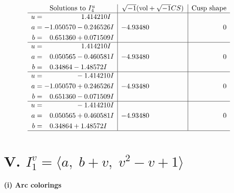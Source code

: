 \documentclass[1p]{elsarticle_modified}
\theoremstyle{definition}
\newcommand{\I}{\sqrt{-1}}
\begin{document}
$$\begin{array}{c|c|c}  
\text{Solutions to }I^u_{4}& \I (\text{vol} + \sqrt{-1}CS) & \text{Cusp shape}\\
 \hline 
\begin{aligned}
u &= \phantom{-0.000000 -}1.414210 I \\
a &= -1.050570 - 0.246526 I \\
b &= \phantom{-}0.651360 + 0.071509 I\end{aligned}
 & -4.93480\phantom{ +0.000000I} & \phantom{-0.000000 } 0 \\ \hline\begin{aligned}
u &= \phantom{-0.000000 -}1.414210 I \\
a &= \phantom{-}0.050565 - 0.460581 I \\
b &= \phantom{-}0.34864 - 1.48572 I\end{aligned}
 & -4.93480\phantom{ +0.000000I} & \phantom{-0.000000 } 0 \\ \hline\begin{aligned}
u &= \phantom{-0.000000 } -1.414210 I \\
a &= -1.050570 + 0.246526 I \\
b &= \phantom{-}0.651360 - 0.071509 I\end{aligned}
 & -4.93480\phantom{ +0.000000I} & \phantom{-0.000000 } 0 \\ \hline\begin{aligned}
u &= \phantom{-0.000000 } -1.414210 I \\
a &= \phantom{-}0.050565 + 0.460581 I \\
b &= \phantom{-}0.34864 + 1.48572 I\end{aligned}
 & -4.93480\phantom{ +0.000000I} & \phantom{-0.000000 } 0\\
 \hline 
 \end{array}$$\newpage\newpage\renewcommand{\arraystretch}{1}
\centering \section*{V. $I^v_{1}= \langle a,\;b+v,\;v^2- v+1 \rangle$}
\flushleft \textbf{(i) Arc colorings}\\
\end{document}
